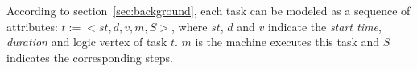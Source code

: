 According to section~\ref{sec:background}, each task can be modeled as a sequence of attributes: $t:=<st, d, v, m, S>$, where $st$, $d$ and $v$ indicate the \textit{start time}, \textit{duration} and logic vertex of task $t$.  $m$ is the machine executes this task and $S$ indicates the corresponding steps.